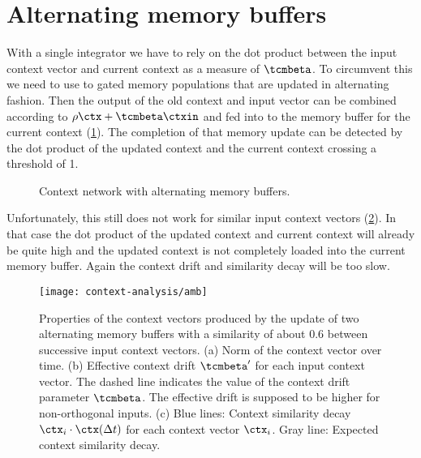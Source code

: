 \section{Alternating memory buffers}
With a single integrator we have to rely on the dot product between the input context vector and current context as a measure of $\tcmbeta$.
To circumvent this we need to use to gated memory populations that are updated in alternating fashion.
Then the output of the old context and input vector can be combined according to $\rho \ctx + \tcmbeta \ctxin$ and fed into to the memory buffer for the current context (\cref{fig:ctx-amb}).
The completion of that memory update can be detected by the dot product of the updated context and the current context crossing a threshold of 1.
\begin{figure}
    \centering
    \caption{Context network with alternating memory buffers.}\label{fig:ctx-amb}
\end{figure}

Unfortunately, this still does not work for similar input context vectors (\cref{fig:amb}).
In that case the dot product of the updated context and current context will already be quite high and the updated context is not completely loaded into the current memory buffer.
Again the context drift and similarity decay will be too slow.
\begin{figure}
    \centering
    \texttt{[image: context-analysis/amb]}
    \caption{
        Properties of the context vectors produced by the update of two alternating memory buffers with a similarity of about $0.6$ between successive input context vectors.
        (a) Norm of the context vector over time.
        (b) Effective context drift $\tcmbeta'$ for each input context vector. The dashed line indicates the value of the context drift parameter $\tcmbeta$. The effective drift is supposed to be higher for non-orthogonal inputs.
        (c) Blue lines: Context similarity decay $\ctx_i \cdot \ctx(\Delta t)$ for each context vector $\ctx_i$. Gray line: Expected context similarity decay.
    }\label{fig:amb}
\end{figure}


